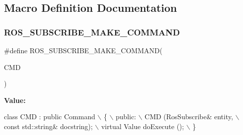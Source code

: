 \subsection{Macro Definition Documentation}
\mbox{\label{ros__subscribe_8hh_a9e53bc3e7fd81d7720e099bd9454e57e}} 
\subsubsection{\texorpdfstring{R\+O\+S\+\_\+\+S\+U\+B\+S\+C\+R\+I\+B\+E\+\_\+\+M\+A\+K\+E\+\_\+\+C\+O\+M\+M\+A\+ND}{ROS\_SUBSCRIBE\_MAKE\_COMMAND}}
{\footnotesize\ttfamily \#define R\+O\+S\+\_\+\+S\+U\+B\+S\+C\+R\+I\+B\+E\+\_\+\+M\+A\+K\+E\+\_\+\+C\+O\+M\+M\+A\+ND(\begin{DoxyParamCaption}\item[{}]{C\+MD }\end{DoxyParamCaption})}

{\bfseries Value\+:}
\begin{DoxyCode}
\textcolor{keyword}{class }CMD : \textcolor{keyword}{public} Command          \(\backslash\)
      \{                         \(\backslash\)
      public:                       \(\backslash\)
    CMD (RosSubscribe& entity,              \(\backslash\)
         \textcolor{keyword}{const} std::string& docstring);     \(\backslash\)
    virtual Value doExecute ();         \(\backslash\)
      \}
\end{DoxyCode}
